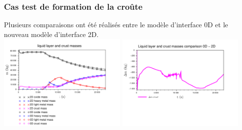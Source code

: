 \documentclass{beamer}
\begin{document}
\begin{frame}[t]
    \frametitle{Cas test de formation de la croûte}
	\footnotesize
	
    Plusieurs comparaisons ont été réalisés entre le modèle d'interface 0D et le nouveau modèle d'interface 2D.\\

    \includegraphics[width=0.47\textwidth]{Figures/IndustrialTestmasses.pdf}
    \includegraphics[width=0.47\textwidth]{Figures/IndustrialTestdiffMasses.pdf}

\end{frame}
\end{document}
